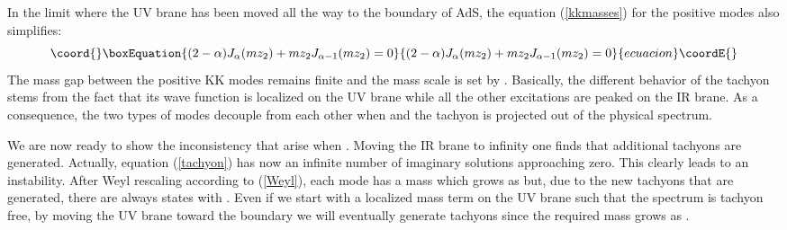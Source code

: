 \documentclass[a4paper,12pt,dvips]{article}
\begin{document}
In the limit where the UV brane has been moved all the way to the
boundary of AdS, the equation (\ref{kkmasses})  for the positive
modes also simplifies:
\begin{equation}\coord{}\boxEquation{
(2-\alpha)J_\alpha(m z_2)+m z_2 J_{\alpha-1}(m z_2)=0
}{
(2-\alpha)J_\alpha(m z_2)+m z_2 J_{\alpha-1}(m z_2)=0
}{ecuacion}\coordE{}\end{equation}
The mass gap between the positive KK modes remains finite and the
mass scale is set by \coordHE{}. Basically, the different behavior of
the tachyon stems from the fact that its wave function is
localized on the UV brane while all the other excitations are
peaked on the IR brane. As a consequence, the two types of modes
decouple from each other when \coordHE{} and the tachyon is
projected out of the physical spectrum.

We are  now ready to show the inconsistency that arise when \coordHE{}. Moving the IR brane to infinity one finds that additional
tachyons are generated. Actually, equation (\ref{tachyon}) has now
an infinite number of imaginary solutions approaching zero. This
clearly leads to an instability. After Weyl rescaling according to
(\ref{Weyl}), each mode has a mass which grows as \coordHE{} but, due
to the new tachyons that are generated, there are always states
with \coordHE{}. Even if we start with a localized mass term
on the UV brane such that the spectrum is tachyon free, by moving
the UV brane toward the boundary we will eventually generate
tachyons since the required mass grows as \coordHE{}.
\end{document}
